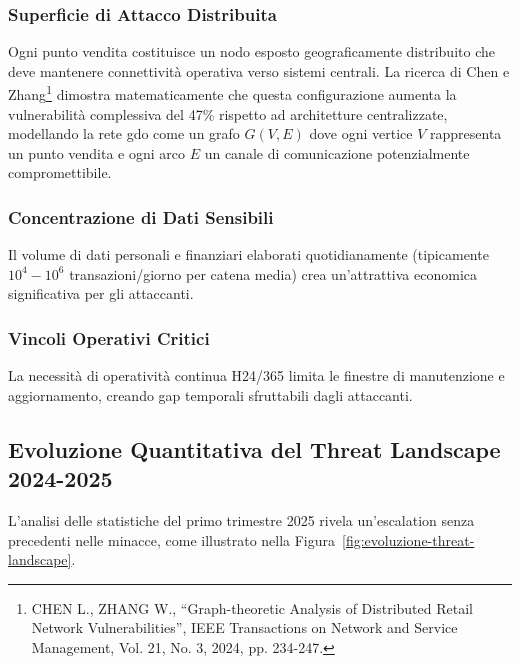 \subsubsection{Superficie di Attacco Distribuita}

Ogni punto vendita costituisce un nodo esposto geograficamente distribuito che deve mantenere connettività operativa verso sistemi centrali. La ricerca di Chen e Zhang\footnote{CHEN L., ZHANG W., ``Graph-theoretic Analysis of Distributed Retail Network Vulnerabilities'', IEEE Transactions on Network and Service Management, Vol. 21, No. 3, 2024, pp. 234-247.} dimostra matematicamente che questa configurazione aumenta la vulnerabilità complessiva del 47\% rispetto ad architetture centralizzate, modellando la rete \gls{gdo} come un grafo $G(V,E)$ dove ogni vertice $V$ rappresenta un punto vendita e ogni arco $E$ un canale di comunicazione potenzialmente compromettibile.

\subsubsection{Concentrazione di Dati Sensibili}

Il volume di dati personali e finanziari elaborati quotidianamente (tipicamente $10^4-10^6$ transazioni/giorno per catena media) crea un'attrattiva economica significativa per gli attaccanti.

\subsubsection{Vincoli Operativi Critici}

La necessità di operatività continua H24/365 limita le finestre di manutenzione e aggiornamento, creando gap temporali sfruttabili dagli attaccanti.

\subsection{Evoluzione Quantitativa del Threat Landscape 2024-2025}
\label{subsec:evoluzione-quantitativa-threat}

L'analisi delle statistiche del primo trimestre 2025 rivela un'escalation senza precedenti nelle minacce, come illustrato nella Figura~\ref{fig:evoluzione-threat-landscape}.

